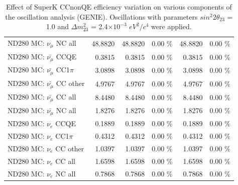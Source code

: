 \begin{table}
\begin{tabular}{| l | r | r  r | r  r |}
                                          ND280 MC: $\nu_{\mu}$ NC all &         48.8820 &         48.8820 &  0.00 \%  &         48.8820 &  0.00 \%  \\ 
                                      ND280 MC: $\bar{\nu_{\mu}}$ CCQE &          0.3815 &          0.3815 &  0.00 \%  &          0.3815 &  0.00 \%  \\ 
                                  ND280 MC: $\bar{\nu_{\mu}}$ CC1$\pi$ &          3.0898 &          3.0898 &  0.00 \%  &          3.0898 &  0.00 \%  \\ 
                                  ND280 MC: $\bar{\nu_{\mu}}$ CC other &          4.9767 &          4.9767 &  0.00 \%  &          4.9767 &  0.00 \%  \\ 
                                    ND280 MC: $\bar{\nu_{\mu}}$ CC all &          8.4480 &          8.4480 &  0.00 \%  &          8.4480 &  0.00 \%  \\ 
                                    ND280 MC: $\bar{\nu_{\mu}}$ NC all &          1.8276 &          1.8276 &  0.00 \%  &          1.8276 &  0.00 \%  \\ 
                                              ND280 MC: $\nu_{e}$ CCQE &          0.1889 &          0.1889 &  0.00 \%  &          0.1889 &  0.00 \%  \\ 
                                          ND280 MC: $\nu_{e}$ CC1$\pi$ &          0.4312 &          0.4312 &  0.00 \%  &          0.4312 &  0.00 \%  \\ 
                                          ND280 MC: $\nu_{e}$ CC other &          1.0397 &          1.0397 &  0.00 \%  &          1.0397 &  0.00 \%  \\ 
                                            ND280 MC: $\nu_{e}$ CC all &          1.6598 &          1.6598 &  0.00 \%  &          1.6598 &  0.00 \%  \\ 
                                            ND280 MC: $\nu_{e}$ NC all &          0.7868 &          0.7868 &  0.00 \%  &          0.7868 &  0.00 \%  \\ 
\hline
\end{tabular}
\caption{ 
  Effect of SuperK CCnonQE efficiency variation
  on various components of the oscillation analysis (GENIE).
  Oscillations with parameters $sin^{2}2\theta_{23}$ = 1.0 and $\Delta m^{2}_{23}$ = 2.4$\times10^{-3}$ $eV^{2}/c^{4}$ were applied.  
}
\label{tab:genie_sk_ccnonqe_eff}
\end{table}

%
%
%
%

